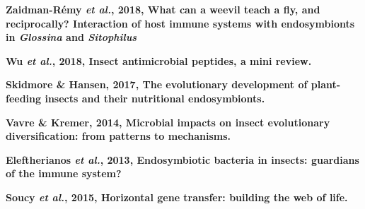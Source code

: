 \documentclass[11pt]{article}
\begin{document}
\begin{sloppypar}
\par
\textbf{Zaidman-Rémy \textit{et al.}, 2018, What can a weevil teach a fly, and reciprocally? Interaction of host immune systems with endosymbionts in \textit{Glossina} and \textit{Sitophilus}} \newline
\par
\textbf{Wu \textit{et al.}, 2018, Insect antimicrobial peptides, a mini review.} \newline
\par
\textbf{Skidmore & Hansen, 2017, The evolutionary development of plant-feeding insects and their nutritional endosymbionts.} \newline
\par
\textbf{Vavre & Kremer, 2014, Microbial impacts on insect evolutionary diversification: from patterns to mechanisms.} \newline
\par
\textbf{Eleftherianos \textit{et al.}, 2013, Endosymbiotic bacteria in insects: guardians of the immune system?}
\par
\textbf{Soucy \textit{et al.}, 2015, Horizontal gene transfer: building the web of life.}
\par


\end{sloppypar}
\end{document}
